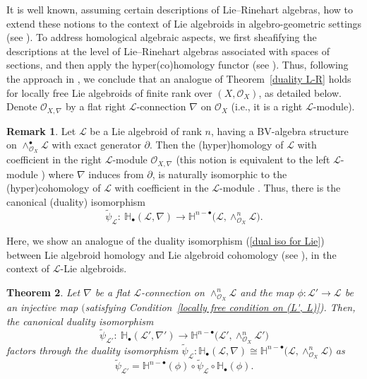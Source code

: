 \documentclass[pdftex]{sigma}
\numberwithin{equation}{section}
\newtheorem{Thm}{Theorem}[section]
\theoremstyle{definition}
\newtheorem{Rem}[Thm]{Remark}
\begin{document}
It is well known, assuming certain descriptions of Lie--Rinehart algebras, how to extend these notions to the context of Lie algebroids in algebro-geometric settings (see \cite{UB, CV, MK, JV}). To address homological algebraic aspects, we first sheafifying the descriptions at the level of Lie--Rinehart algebras associated with spaces of sections, and then apply the hyper(co)homology functor (see \cite{UB, BRT, AS}).
Thus, following the approach in \cite{JH1}, we conclude that an analogue of Theorem~\ref{duality L-R} holds for locally free Lie algebroids of finite rank over $(X, \mathcal{O}_X)$, as detailed below. Denote $\mathcal{O}_{X, \nabla}$ by a flat right $\mathcal{L}$-connection $\nabla$ on $\mathcal{O}_X$ (i.e., it is a right $\mathcal{L}$-module).

\begin{Rem} \label{duality for BV-Lie algebroids}
	Let $\mathcal{L}$ be a Lie algebroid of rank $n$, having a BV-algebra structure on $\wedge^{\bullet}_{\mathcal{O}_X} \mathcal{L}$ with exact generator $\partial$. Then the (hyper)homology of $\mathcal{L}$ with coefficient in the right $\mathcal{L}$-module $\mathcal{O}_{X, \nabla}$ (this notion is equivalent to the left $\mathcal{L}$-module ) where $\nabla$ induces from $\partial$, is naturally isomorphic to the (hyper)cohomology of $\mathcal{L}$ with coefficient in the $\mathcal{L}$-module . Thus, there is the canonical (duality) isomorphism
\begin{equation}\label{dual iso for Lie}
	\tilde{\psi}_{\mathcal{L}}\colon \
	\mathbb{H}_{\bullet}(\mathcal{L}, \nabla)
	\rightarrow
	\mathbb{H}^{n-\bullet}
 \bigl(\mathcal{L},
	\wedge^n_{\mathcal{O}_X}\mathcal{L} \bigr).
\end{equation}
\end{Rem}

Here, we show an analogue of the duality isomorphism (\ref{dual iso for Lie}) between Lie algebroid homology and Lie algebroid cohomology (see \cite{JH1, JH2, PX}), in the context of $\mathcal{L}$-Lie algebroids.

\begin{Thm} \label{L-version duality} Let $\nabla$ be a flat $\mathcal{L}$-connection on $\wedge^n_{\mathcal{O}_X} \mathcal{L}$ and the map $\phi\colon \mathcal{L}' \rightarrow \mathcal{L}$ be an injective map $($satisfying Condition~{\rm \ref{locally free condition on (L', L)})}.
	Then, the canonical duality isomorphism
\[
\tilde{\psi}_{\mathcal{L}'}\colon \ \mathbb{H}_{\bullet}(\mathcal{L}', \nabla') \rightarrow \mathbb{H}^{n- \bullet}\bigl(\mathcal{L}', \wedge^n_{\mathcal{O}_X} \mathcal{L}'\bigr)
\] factors through the duality isomorphism $\tilde{\psi}_{\mathcal{L}}\colon \mathbb{H}_{\bullet}(\mathcal{L}, \nabla) \cong \mathbb{H}^{n- \bullet}\bigl(\mathcal{L}, \wedge^n_{\mathcal{O}_X} \mathcal{L}\bigr)$ as
\[
\tilde{\psi}_{\mathcal{L}'}=\mathbb{H}^{n- \bullet}(\phi) \circ \tilde{\psi}_{\mathcal{L}} \circ \mathbb{H}_{\bullet} (\phi).
\]
\end{Thm}
\end{document}
